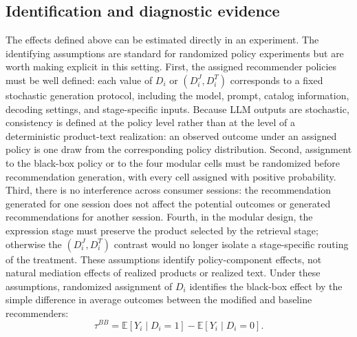\documentclass[11pt]{article}
\newcommand{\Expect}{\mathbb{E}}
\newcommand{\Y}{Y}
\begin{document}
\subsection{Identification and diagnostic evidence}

The effects defined above can be estimated directly in an experiment. The identifying assumptions are standard for randomized policy experiments but are worth making explicit in this setting. First, the assigned recommender policies must be well defined: each value of $D_i$ or $(D_i^J,D_i^T)$ corresponds to a fixed stochastic generation protocol, including the model, prompt, catalog information, decoding settings, and stage-specific inputs. Because LLM outputs are stochastic, consistency is defined at the policy level rather than at the level of a deterministic product-text realization: an observed outcome under an assigned policy is one draw from the corresponding policy distribution. Second, assignment to the black-box policy or to the four modular cells must be randomized before recommendation generation, with every cell assigned with positive probability. Third, there is no interference across consumer sessions: the recommendation generated for one session does not affect the potential outcomes or generated recommendations for another session. Fourth, in the modular design, the expression stage must preserve the product selected by the retrieval stage; otherwise the $(D_i^J,D_i^T)$ contrast would no longer isolate a stage-specific routing of the treatment. These assumptions identify policy-component effects, not natural mediation effects of realized products or realized text. Under these assumptions, randomized assignment of $D_i$ identifies the black-box effect by the simple difference in average outcomes between the modified and baseline recommenders:
\begin{equation}
\tau^{BB} = \Expect[\Y_i \mid D_i = 1] - \Expect[\Y_i \mid D_i = 0].
\label{eq:identify-bb}
\end{equation}
\end{document}
